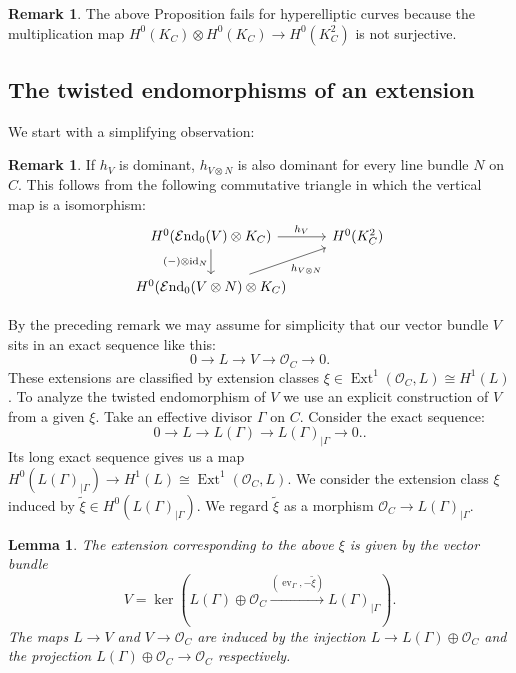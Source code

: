 \documentclass[12pt]{extarticle}
\newtheorem{lemma}[theorem]{Lemma}
\theoremstyle{definition}
\newtheorem{remark}[theorem]{Remark}
\numberwithin{theorem}{section}
\newcommand{\OO}{\mathcal{O}}
\newcommand{\op}{\operatorname}
\DeclareMathOperator{\End}{\mathcal{E}nd}
\renewcommand{\tilde}{\widetilde}		%
\begin{document}
\begin{remark}
The above Proposition fails for hyperelliptic curves because the multiplication map $H^0(K_C) \otimes H^0(K_C) \to H^0(K_C^2)$ is not surjective.
\end{remark}
\subsection{The twisted endomorphisms of an extension}
We start with a simplifying observation:
\begin{remark}
If $h_V$ is dominant, $h_{V\otimes N}$ is also dominant for every line bundle $N$ on $C$. This follows from the following commutative triangle in which the vertical map is a isomorphism:
\begin{equation*}
\begin{tikzcd}
	{H^0(\End_0(V)\otimes K_C)} & {H^0(K_C^2)} \\
	{H^0(\End_0(V\otimes N)\otimes K_C)}
	\arrow["{h_V}", from=1-1, to=1-2]
	\arrow["{(-)\otimes \op{id}_N}"', from=1-1, to=2-1]
	\arrow["{h_{V\otimes N}}"', from=2-1, to=1-2]
\end{tikzcd}
\end{equation*}
\end{remark}
By the preceding remark we may assume for simplicity that our vector bundle $V$ sits in an exact sequence like this:
\begin{equation}
0 \to L \to V \to \OO_C \to 0.
\end{equation} 
These extensions are classified by extension classes $ \xi \in \op{Ext}^1(\OO_C,L) \cong H^1(L)$. To analyze the twisted endomorphism of $V$ we use an explicit construction of $V$ from a given $\xi$. Take an effective divisor $\Gamma$ on $C$. Consider the exact sequence:
\begin{equation*}
0 \to L \to L(\Gamma) \to L(\Gamma)_{|\Gamma} \to 0..
\end{equation*}
Its long exact sequence gives us a map $H^0(L(\Gamma)_{|\Gamma})\to H^1(L) \cong \op{Ext}^1(\OO_C,L)$. We consider the extension class $\xi$ induced by $\tilde{\xi} \in H^0(L(\Gamma)_{|\Gamma})$. We regard $\tilde{\xi}$ as a morphism $\OO_C \to L(\Gamma)_{|\Gamma}$.
\begin{lemma}\label{lemma:yoneda}
The extension corresponding to the above $\xi$ is given by the vector bundle 
\begin{equation}\label{eq:ext_as_a_subbundle}
V = \op{ker}\left(L(\Gamma) \oplus \OO_C \xrightarrow{(\op{ev}_\Gamma,-\tilde{\xi})} L(\Gamma)_{|\Gamma} \right).
\end{equation}
The maps $L \to V$ and $V \to \OO_C$ are induced by the injection $L\to  L(\Gamma)\oplus \OO_C$ and the projection $L(\Gamma)\oplus \OO_C \to \OO_C$ respectively. 
\end{lemma}
\end{document}
